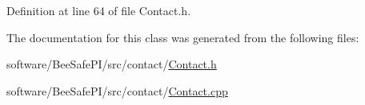 Definition at line 64 of file Contact.\+h.



The documentation for this class was generated from the following files\+:\begin{DoxyCompactItemize}
\item 
software/\+Bee\+Safe\+P\+I/src/contact/\hyperlink{_contact_8h}{Contact.\+h}\item 
software/\+Bee\+Safe\+P\+I/src/contact/\hyperlink{_contact_8cpp}{Contact.\+cpp}\end{DoxyCompactItemize}
